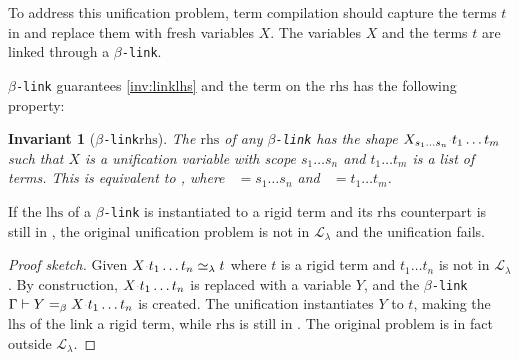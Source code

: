 \documentclass[sigconf,natbib=false,review]{acmart}
\newtheorem{invariant}{Invariant}
\newcommand{\appsep}{\ensuremath{\textcolor{lightgray}{\cdot}}}
\newcommand{\UnifRel}{\ensuremath{\simeq}}
\newcommand{\Ue}{\ensuremath{\UnifRel_\lambda}\xspace}
\newcommand{\llambda}{\ensuremath{\mathcal{L}_\lambda}\xspace}
\newcommand{\linkMacro}[1]{\ensuremath{#1}\texttt{-link}\xspace}
\newcommand{\linkbeta}{\linkMacro{\beta}}
\newcommand{\linkbetaM}[3]{\ensuremath{#1 \vdash #2 =_\beta #3}}
\newcommand{\lhs}{\ensuremath{\mathrm{lhs}}\xspace}
\newcommand{\rhs}{\ensuremath{\mathrm{rhs}}\xspace}
\newcommand{\linkStore}{\ensuremath{\mathbb{L}}\xspace}
\begin{document}
To address
this unification problem, term compilation should capture the
terms $t$ in \notllambda and replace them with fresh variables $X$.
The variables $X$ and the terms $t$ are linked through a \linkbeta.

\linkbeta guarantees \cref{inv:linklhs} and the term on the \rhs has the
following property:

\newcommand{\rhsBetaHead}{\ensuremath{X_{s_1\dots s_n}}}
\newcommand{\rhsBeta}{\ensuremath{\rhsBetaHead\appsep t_1\dots t_m}\xspace}

\begin{invariant}[\linkbeta \rhs]
  The \rhs of any \linkbeta has the shape \rhsBeta such that $X$ is a
  unification variable with scope $s_1\dots s_n$ and $t_1\dots t_m$ is a list of
  terms. This is equivalent to , where ~$=
  s_1\dots s_n$ and ~$=t_1\dots t_m$.
  \label{inv:beta-rhs}
\end{invariant}


\begin{lemma}[\linkbeta with rigid \lhs]
  If the \lhs of a \linkbeta is instantiated to a rigid term and its \rhs
  counterpart is still in \notllambda,
  the original unification problem is not in \llambda
  and the unification fails.
  \label{lemma:keep-fidelity}
\end{lemma}

\begin{proof}[Proof sketch]
  Given $X \appsep t_1\dots t_n \Ue t$ where $t$ is a rigid term and
  $t_1\dots t_n$ is not in \llambda. By construction, $X \appsep t_1\dots t_n$
  is replaced with a variable $Y$, and the \linkbeta \linkbetaM{\Gamma}{Y}{X
  \appsep t_1\dots t_n} is created. The unification instantiates $Y$ to $t$,
  making the \lhs of the link a rigid term, while \rhs is still in \notllambda.
  The original problem is in fact outside \llambda.
\end{proof}
\end{document}
